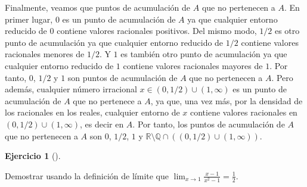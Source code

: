 \documentclass[
  spanish,
  a4paper,
]{scrreport}
\theoremstyle{definition}
\newtheorem{exercise}{Ejercicio}[chapter]
\theoremstyle{remark}
\begin{document}
\begin{tcolorbox}
Finalmente, veamos que puntos de acumulación de \(A\) que no pertenecen
a \(A\). En primer lugar, \(0\) es un punto de acumulación de \(A\) ya
que cualquier entorno reducido de \(0\) contiene valores racionales
positivos. Del mismo modo, \(1/2\) es otro punto de acumulación ya que
cualquier entorno reducido de \(1/2\) contiene valores racionales
menores de \(1/2\). Y \(1\) es también otro punto de acumulación ya que
cualquier entorno reducido de \(1\) contiene valores racionales mayores
de \(1\). Por tanto, \(0\), \(1/2\) y \(1\) son puntos de acumulación de
\(A\) que no pertenecen a \(A\). Pero además, cualquier número
irracional \(x\in (0,1/2) \cup (1,\infty)\) es un punto de acumulación
de \(A\) que no pertenece a \(A\), ya que, una vez más, por la densidad
de los racionales en los reales, cualquier entorno de \(x\) contiene
valores racionales en \((0,1/2) \cup (1,\infty)\), es decir en \(A\).
Por tanto, los puntos de acumulación de \(A\) que no pertenecen a \(A\)
son \(0\), \(1/2\), \(1\) y
\(\mathbb{R}\setminus\mathbb{Q}\cap((0,1/2) \cup (1,\infty))\).

\end{tcolorbox}

\begin{exercise}[]\protect\hypertarget{exr-5}{}\label{exr-5}

Demostrar usando la definición de límite que
\(\lim_{x\to 1}\frac{x-1}{x^2-1} = \frac{1}{2}\).

\end{exercise}
\end{document}
